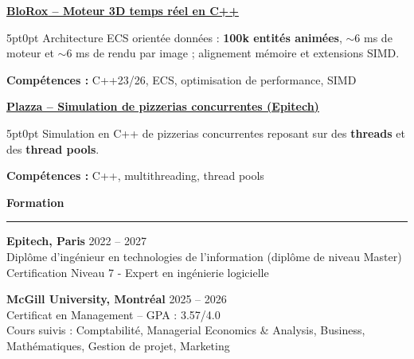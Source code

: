 \documentclass[9pt]{extarticle}
\begin{document}
\underline{\bfseries \href{https://github.com/paulogarithm/blorox}{BloRox} -- Moteur 3D temps réel en C++}
\par
\begin{adjustwidth}{5pt}{0pt}
	Architecture ECS orientée données : {\bfseries 100k entités animées}, $\sim$6 ms de moteur et $\sim$6 ms de rendu par image ; alignement mémoire et extensions SIMD.
\end{adjustwidth}
\par
{\bfseries Compétences :} C++23/26, ECS, optimisation de performance, SIMD

\par\vspace{8pt}

\underline{\bfseries Plazza -- Simulation de pizzerias concurrentes (Epitech)}
\par
\begin{adjustwidth}{5pt}{0pt}
    Simulation en C++ de pizzerias concurrentes reposant sur des {\bfseries threads} et des {\bfseries thread pools}.
\end{adjustwidth}
\par
{\bfseries Compétences :} C++, multithreading, thread pools

\par\vspace{8pt}

{\large\bfseries Formation}
\par\vspace{-8pt}
\rule{\linewidth}{0.4pt}
\par\vspace{5pt}

{\bfseries Epitech, Paris} \hfill 2022 -- 2027 \\
Diplôme d'ingénieur en technologies de l'information (diplôme de niveau Master) \\
Certification Niveau 7 - Expert en ingénierie logicielle

\vspace{6pt}

{\bfseries McGill University, Montréal} \hfill 2025 -- 2026 \\
Certificat en Management -- GPA : 3.57/4.0 \\
Cours suivis : Comptabilité, Managerial Economics \& Analysis, Business, Mathématiques, Gestion de projet, Marketing
\end{document}
